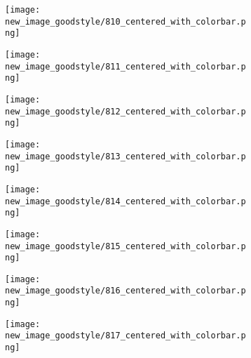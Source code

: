\documentclass[a4paper,12pt]{article}
\begin{document}
\begin{figure}[H]
  \begin{subfigure}{0.11\textwidth}
    \texttt{[image: new\_image\_goodstyle/810\_centered\_with\_colorbar.png]}
  \end{subfigure}
  \hfill
  \begin{subfigure}{0.11\textwidth}
    \texttt{[image: new\_image\_goodstyle/811\_centered\_with\_colorbar.png]}
  \end{subfigure}
  \hfill
  \begin{subfigure}{0.11\textwidth}
    \texttt{[image: new\_image\_goodstyle/812\_centered\_with\_colorbar.png]}
  \end{subfigure}
  \hfill
  \begin{subfigure}{0.11\textwidth}
    \texttt{[image: new\_image\_goodstyle/813\_centered\_with\_colorbar.png]}
  \end{subfigure}
  \hfill
  \begin{subfigure}{0.11\textwidth}
    \texttt{[image: new\_image\_goodstyle/814\_centered\_with\_colorbar.png]}
  \end{subfigure}
  \hfill
  \begin{subfigure}{0.11\textwidth}
    \texttt{[image: new\_image\_goodstyle/815\_centered\_with\_colorbar.png]}
  \end{subfigure}
  \hfill
  \begin{subfigure}{0.11\textwidth}
    \texttt{[image: new\_image\_goodstyle/816\_centered\_with\_colorbar.png]}
  \end{subfigure}
  \hfill
  \begin{subfigure}{0.11\textwidth}
    \texttt{[image: new\_image\_goodstyle/817\_centered\_with\_colorbar.png]}
  \end{subfigure}
  \hfill
\end{figure}
\end{document}
